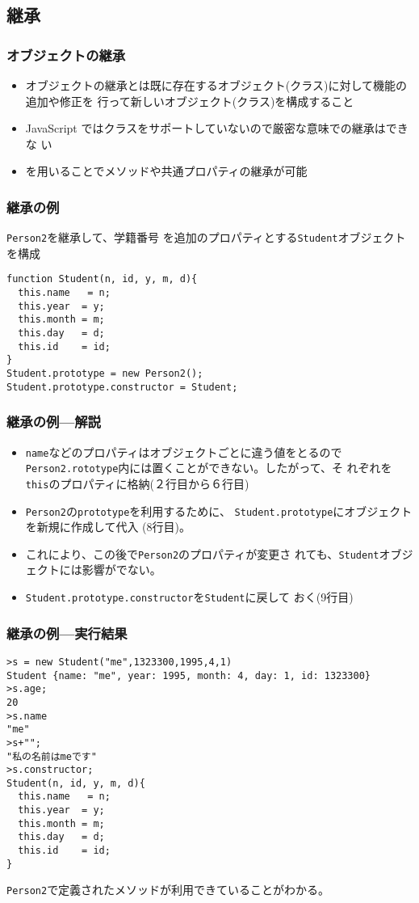 \subsection{継承}
\begin{frame}[containsverbatim]
 \frametitle{オブジェクトの継承}
 \begin{itemize}
  \item オブジェクトの継承とは既に存在するオブジェクト(クラス)に対して機能の追加や修正を
        行って新しいオブジェクト(クラス)を構成すること
  \item JavaScript ではクラスをサポートしていないので厳密な意味での継承はできな
        い
  \item {}を用いることでメソッドや共通プロパティの継承が可能
 \end{itemize}
 \end{frame}
\begin{frame}[containsverbatim]
 \frametitle{継承の例}
 \texttt{Person2}を継承して、学籍番号
 を追加のプロパティとする\texttt{Student}オブジェクトを構成
\begin{Verbatim}
function Student(n, id, y, m, d){
  this.name   = n;
  this.year  = y;
  this.month = m;
  this.day   = d;
  this.id    = id;
}
Student.prototype = new Person2();
Student.prototype.constructor = Student;
\end{Verbatim}
\end{frame}
\begin{frame}[containsverbatim]
 \frametitle{継承の例---解説}
 \begin{itemize}
 \item \texttt{name}などのプロパティはオブジェクトごとに違う値をとるので
       \texttt{Person2.rototype}内には置くことができない。したがって、そ
       れぞれを\texttt{this}のプロパティに格納(２行目から６行目)
 \item \texttt{Person2}の\texttt{prototype}を利用するために、
       \texttt{Student.prototype}にオブジェクトを新規に作成して代入
       (8行目)。
  \item これにより、この後で\texttt{Person2}のプロパティが変更さ
       れても、\texttt{Student}オブジェクトには影響がでない。
 \item \texttt{Student.prototype.constructor}を\texttt{Student}に戻して
       おく(9行目)
\end{itemize}
\end{frame}
\begin{frame}[containsverbatim]
 \frametitle{継承の例---実行結果}
\begin{Verbatim}
>s = new Student("me",1323300,1995,4,1)
Student {name: "me", year: 1995, month: 4, day: 1, id: 1323300}
>s.age;
20
>s.name
"me"
>s+"";
"私の名前はmeです"
>s.constructor;
Student(n, id, y, m, d){
  this.name   = n;
  this.year  = y;
  this.month = m;
  this.day   = d;
  this.id    = id;
}
\end{Verbatim}
\texttt{Person2}で定義されたメソッドが利用できていることがわかる。
\end{frame}

